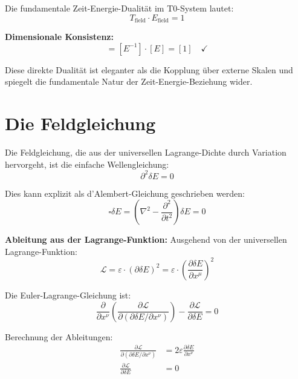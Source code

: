 \documentclass[12pt,a4paper]{report}
\begin{document}
	Die fundamentale Zeit-Energie-Dualität im T0-System lautet:
	\begin{equation}
		\boxed{T_{\text{field}} \cdot E_{\text{field}} = 1}
		\label{eq:time_energy_duality}
	\end{equation}
	
	\textbf{Dimensionale Konsistenz:}
	\begin{equation}
		[T_{\text{field}} \cdot E_{\text{field}}] = [E^{-1}] \cdot [E] = [1] \quad \checkmark
	\end{equation}
	
	Diese direkte Dualität ist eleganter als die Kopplung über externe Skalen und spiegelt die fundamentale Natur der Zeit-Energie-Beziehung wider.
	
\section{Die Feldgleichung}

Die Feldgleichung, die aus der universellen Lagrange-Dichte durch Variation hervorgeht, ist die einfache Wellengleichung:
\begin{equation}
	\boxed{\partial^2 \delta E = 0}
	\label{eq:field_equation}
\end{equation}

Dies kann explizit als d'Alembert-Gleichung geschrieben werden:
\begin{equation}
	\square \delta E = \left(\nabla^2 - \frac{\partial^2}{\partial t^2}\right) \delta E = 0
\end{equation}

\textbf{Ableitung aus der Lagrange-Funktion:}
Ausgehend von der universellen Lagrange-Funktion:
\begin{equation}
	\mathcal{L} = \varepsilon \cdot (\partial\delta E)^2 = \varepsilon \cdot \left(\frac{\partial \delta E}{\partial x^\mu}\right)^2
\end{equation}

Die Euler-Lagrange-Gleichung ist:
\begin{equation}
	\frac{\partial}{\partial x^\nu}\left(\frac{\partial \mathcal{L}}{\partial(\partial \delta E/\partial x^\nu)}\right) - \frac{\partial \mathcal{L}}{\partial \delta E} = 0
\end{equation}

Berechnung der Ableitungen:
\begin{align}
	\frac{\partial \mathcal{L}}{\partial(\partial \delta E/\partial x^\nu)} &= 2\varepsilon \frac{\partial \delta E}{\partial x^\nu} \\
	\frac{\partial \mathcal{L}}{\partial \delta E} &= 0
\end{align}
\end{document}

